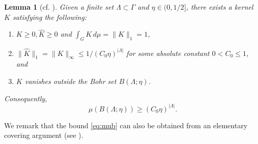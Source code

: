 \documentclass[10pt]{article}
\newtheorem{lemma}[lemma]{Lemma}
\theoremstyle{definition}
\begin{document}
\begin{lemma}[cf. {\cite[Lemma 4.3]{bhmp}}]
\label{lem:kernel_a}
    Given a finite set $\Lambda \subset \Gamma$ and $\eta \in (0, 1/2]$, there exists a kernel $K$ satisfying the following:
    \begin{enumerate}
        \item $K \geq 0, \widehat{K} \geq 0$ and $\int_G K \, d \mu = \lVert K \rVert_1 = 1$,
        \item $\lVert \widehat{K} \rVert_1 = \lVert K \rVert_{\infty} \leq 1/(C_0\eta)^{|\Lambda|}$ for some absolute constant $0 < C_0 \leq 1$, and         
        \item $K$ vanishes outside the Bohr set $B( \Lambda; \eta)$.
    \end{enumerate}
Consequently, 
\begin{equation} \label{eq:mub}
\mu(B( \Lambda; \eta)) \geq (C_0\eta)^{|\Lambda|}.
\end{equation} 
\end{lemma}
We remark that the bound \eqref{eq:mub} can also be obtained from an elementary covering argument (see \cite{tao}). 
\end{document}
